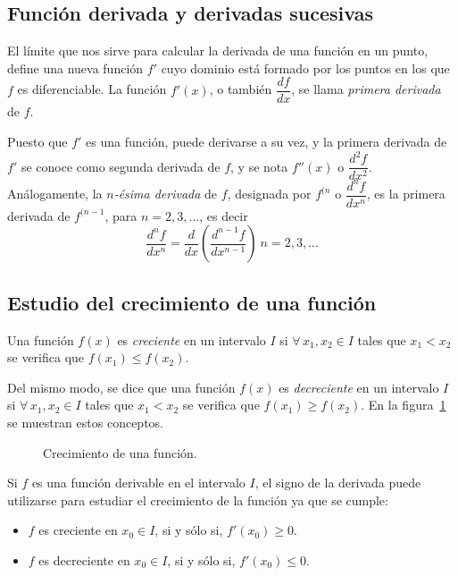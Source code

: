 \subsection{Función derivada y derivadas sucesivas}

El límite que nos sirve para calcular la derivada de una función en
un punto, define una nueva función $f'$ cuyo dominio está formado
por los puntos en los que $f$ es diferenciable. La función $f'(x)$,
o también $\dfrac{df}{dx}$, se llama \emph{primera derivada} de $f$.

Puesto que $f'$ es una función, puede derivarse a su vez, y la
primera derivada de $f'$ se conoce como segunda derivada de $f$, y
se nota $f''(x)$ o $\dfrac{d^2f}{dx^2}$. Análogamente, la
\emph{$n$-ésima derivada} de $f$, designada por $f^{(n}$ o
$\dfrac{d^nf}{dx^n}$, es la primera derivada de $f^{(n-1}$, para
$n=2,3,\ldots$, es decir
\[
\frac{d^nf}{dx^n}=\frac{d}{dx}\left(\frac{d^{n-1}f}{dx^{n-1}}\right)\
n=2,3,\ldots
\]


\subsection{Estudio del crecimiento de una función}
Una función $f(x)$ es \emph{creciente} en un intervalo $I$ si
$\forall\, x_1, x_2 \in I$ tales que $x_1<x_2$ se verifica que
$f(x_1)\leq f(x_2)$.

Del mismo modo, se dice que una función $f(x)$ es \emph{decreciente}
en un intervalo $I$ si $\forall\, x_1, x_2 \in I$ tales que
$x_1<x_2$ se verifica que $f(x_1)\geq f(x_2)$. En la
figura~\ref{g:crecimiento_derivada} se muestran estos conceptos.

\begin{figure}[h!]
\centering \subfigure[Función creciente.] {\label{g:funcion_creciente}
\scalebox{1}{}}\qquad
{}
\caption{Crecimiento de una función.}
\label{g:crecimiento_derivada}
\end{figure}

Si $f$ es una función derivable en el intervalo $I$, el signo de la
derivada puede utilizarse para estudiar el crecimiento de la función
ya que se cumple:
\begin{itemize}
\item $f$ es creciente en $x_0\in I$, si y sólo si, $f'(x_0)\geq 0$.
\item $f$ es decreciente en $x_0\in I$, si y sólo si, $f'(x_0)\leq 0$.
\end{itemize}

